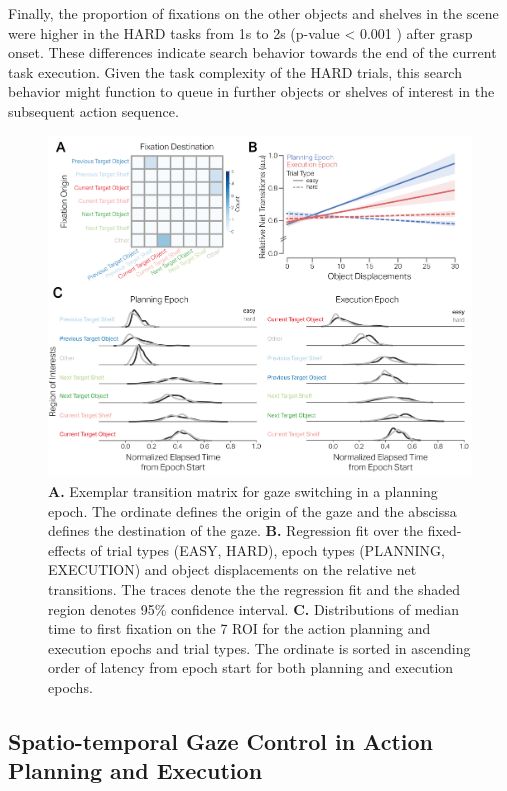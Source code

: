 Finally, the proportion of fixations on the other objects and shelves in the scene were higher in the HARD tasks from 1s to 2s (p-value < 0.001 ) after grasp onset. These differences indicate search behavior towards the end of the current task execution. Given the task complexity of the HARD trials, this search behavior might function to queue in further objects or shelves of interest in the subsequent action sequence. 


\begin{figure}[t]
    \centering
    \includegraphics[width=1\linewidth]{source/figures/results/results_3.png}
    \caption[Spatiotemporal characteristics of gaze control]{\textbf{A.} Exemplar transition matrix for gaze switching in a planning epoch. The ordinate defines the origin of the gaze and the abscissa defines the destination of the gaze. \textbf{B.} Regression fit over the fixed-effects of trial types (EASY, HARD), epoch types (PLANNING, EXECUTION) and object displacements on the relative net transitions. The traces denote the the regression fit and the shaded region denotes 95\% confidence interval. \textbf{C.} Distributions of median time to first fixation on the 7 ROI for the action planning and execution epochs and trial types. The ordinate is sorted in ascending order of latency from epoch start for both planning and execution epochs. }
     \label{figure:spatiotemp}
\end{figure}


\subsection{Spatio-temporal Gaze Control in Action Planning and Execution}

